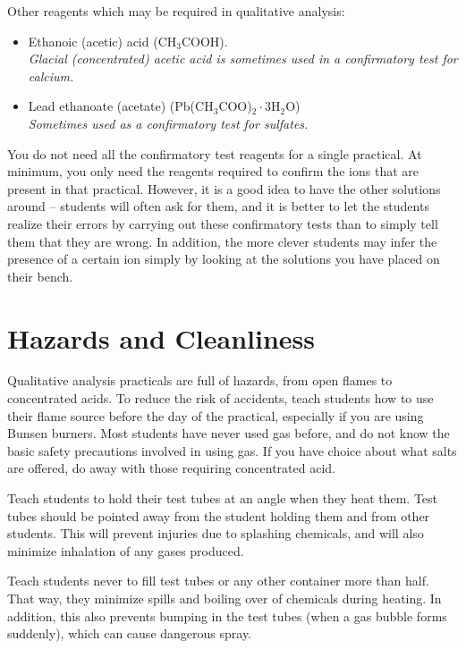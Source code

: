 Other reagents which may be required in qualitative analysis:
\begin{itemize}
\item{Ethanoic (acetic) acid (CH$_{3}$COOH).}\\
\textit{Glacial (concentrated) acetic acid 
is sometimes used in a confirmatory test for calcium.}
\item{Lead ethanoate (acetate) (Pb(CH$_{3}$COO)$_{2} \cdot$3H$_{2}$O)}\\
\textit{Sometimes used as a confirmatory test for sulfates.}
\end{itemize}
You do not need all the confirmatory test reagents for a single practical. 
At minimum, 
you only need the reagents required to confirm the ions 
that are present in that practical. 
However, 
it is a good idea to have the other solutions around -- 
students will often ask for them, 
and it is better to let the students realize their errors 
by carrying out these confirmatory tests 
than to simply tell them that they are wrong. 
In addition, 
the more clever students may infer the presence of a certain ion 
simply by looking at the solutions you have placed on their bench.

\section{Hazards and Cleanliness}
Qualitative analysis practicals are full of hazards, 
from open flames to concentrated acids. 
To reduce the risk of accidents, 
teach students how to use their flame source 
before the day of the practical, 
especially if you are using Bunsen burners. 
Most students have never used gas before, 
and do not know the basic safety precautions involved in using gas. 
If you have choice about what salts are offered, 
do away with those requiring concentrated acid.

Teach students to hold their test tubes at an angle when they heat them. 
Test tubes should be pointed away from the student holding them 
and from other students. 
This will prevent injuries due to splashing chemicals, 
and will also minimize inhalation of any gases produced.

Teach students never to fill test tubes 
or any other container more than half. 
That way, 
they minimize spills and boiling over of chemicals during heating. 
In addition, 
this also prevents bumping in the test tubes 
(when a gas bubble forms suddenly), 
which can cause dangerous spray.


